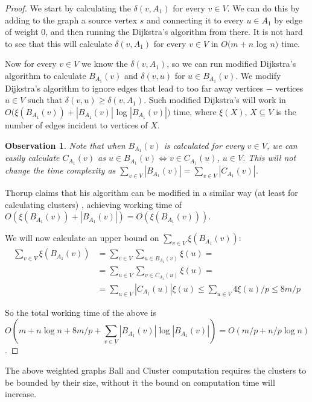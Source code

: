 \documentclass[shortabstract, lic, english]{iithesis}
\theoremstyle{definition} \newtheorem{definition}{Definition}[chapter]
\theoremstyle{plain} \newtheorem{remark}[definition]{Observation}
\theoremstyle{plain} \newtheorem{theorem}[definition]{Theorem}
\theoremstyle{plain} \newtheorem{lemma}[definition]{Lemma}
\theoremstyle{plain} \newtheorem{conjecture}[definition]{Conjecture}
\begin{document}
\begin{proof}
    We start by calculating the $\delta(v, A_1)$ for every $v \in V$. We can do this by adding to the graph a source vertex $s$ and connecting it to every $u \in A_1$ by edge of weight $0$, and then
    running the Dijkstra's algorithm from there. It is not hard to see that this will calculate $\delta(v, A_1)$ for every $v \in V$ in $O(m + n $ log $n)$ time.
    
    Now for every $v \in V$ we know the $\delta(v, A_1)$, so
    we can run modified Dijkstra's algorithm to calculate $B_{A_1}(v)$ and $\delta(v, u)$ for $u \in B_{A_1}(v)$.
    We modify Dijkstra's algorithm to ignore edges that lead to too far away vertices $-$ vertices $u \in V$ such that $\delta(v,u) \geq \delta(v, A_1)$.
    Such modified Dijkstra's will work in $O(\xi(B_{A_1}(v)) + |B_{A_1}(v)| $ log $|B_{A_1}(v)|)$ time, where $\xi(X)$, $X \subseteq V$
    is the number of edges incident to vertices of $X$.
    
    \begin{remark} \label{ballClusterEquivalence}
    Note that when $B_{A_1}(v)$ is calculated for every $v \in V$, we can easily calculate $C_{A_1}(v)$ as $u \in B_{A_1}(v) \iff v \in C_{A_1}(u)$, $u \in V$.
    This will not change the time complexity as $\sum_{v \in V}|B_{A_1}(v)| = \sum_{v \in V}|C_{A_1}(v)|$.
    \end{remark}

    Thorup claims that his algorithm can be modified in a similar way (at least for calculating clusters) \cite{a0OraclesBasic},
    achieving working time of $O(\xi(B_{A_1}(v)) + |B_{A_1}(v)|) = O(\xi(B_{A_1}(v)))$.

    We will now calculate an upper bound on $\sum_{v \in V} \xi(B_{A_1}(v))$:
    \begin{align}
    \sum_{v \in V} \xi(B_{A_1}(v)) &= \sum_{v \in V} \sum_{u \in B_{A_1}(v)} \xi(u) = \nonumber\\
    &= \sum_{u \in V} \sum_{v \in C_{A_1}(u)} \xi(u) = \nonumber\\
    &= \sum_{u \in V} |C_{A_1}(u)|\xi(u) \leq \sum_{u \in V} 4\xi(u)/p \leq 8m/p \nonumber
    \end{align}

    So the total working time of the above is
    $$O(m + n \log n + 8m/p + \sum_{v \in V}|B_{A_1}(v)| \log |B_{A_1}(v)|) = O(m/p + n/p \log n)$$.
\end{proof}

The above weighted graphs Ball and Cluster computation requires the clusters to be bounded by their size, without it the bound on computation time will increase.
\end{document}
